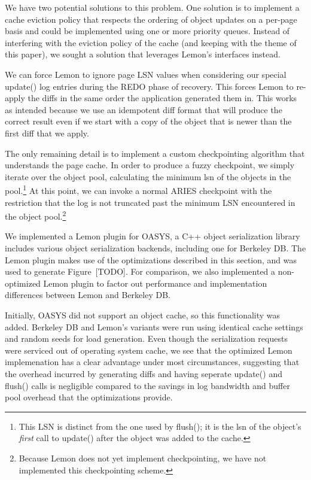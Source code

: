 \documentclass[letterpaper,twocolumn,english]{article}
\newcommand{\yad}{Lemon\xspace}
\begin{document}
We have two potential solutions to this problem.  One solution is to
implement a cache eviction policy that respects the ordering of object
updates on a per-page basis and could be implemented using one or
more priority queues.  Instead of interfering with the eviction policy
of the cache (and keeping with the theme of this paper), we sought a
solution that leverages \yad's interfaces instead.

We can force \yad to ignore page LSN values when considering our
special update() log entries during the REDO phase of recovery.  This
forces \yad to re-apply the diffs in the same order the application
generated them in.  This works as intended because we use an
idempotent diff format that will produce the correct result even if we
start with a copy of the object that is newer than the first diff that
we apply.

The only remaining detail is to implement a custom checkpointing
algorithm that understands the page cache.  In order to produce a
fuzzy checkpoint, we simply iterate over the object pool, calculating
the minimum lsn of the objects in the pool.\footnote{This LSN is distinct from
the one used by flush(); it is the lsn of the object's {\em first}
call to update() after the object was added to the cache.}  At this
point, we can invoke a normal ARIES checkpoint with the restriction
that the log is not truncated past the minimum LSN encountered in the
object pool.\footnote{Because \yad does not yet implement
checkpointing, we have not implemented this checkpointing scheme.}

We implemented a \yad plugin for OASYS, a C++ object serialization
library includes various object serialization backends, including one
for Berkeley DB.  The \yad plugin makes use of the optimizations
described in this section, and was used to generate Figure~[TODO].
For comparison, we also implemented a non-optimized \yad plugin to
factor out performance and implementation differences between \yad
and Berkeley DB.

Initially, OASYS did not support an object cache, so this
functionality was added.  Berkeley DB and \yad's variants were run
using identical cache settings and random seeds for load generation.
Even though the serialization requests were serviced out of operating
system cache, we see that the optimized \yad implemenation has a
clear advantage under most circumstances, suggesting that the overhead
incurred by generating diffs and having seperate update() and flush()
calls is negligible compared to the savings in log bandwidth and
buffer pool overhead that the optimizations provide.
\end{document}
